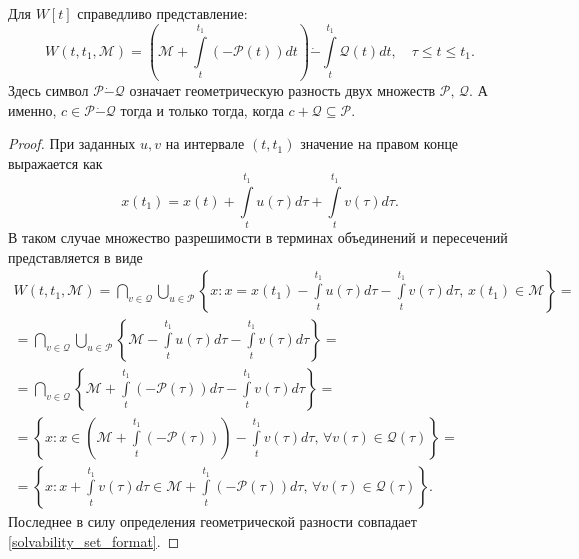 \begin{statement}
    Для \( W[t] \) справедливо представление:
    \begin{equation}\label{solvability_set_format}
        W(t,t_1,\mathcal{M}) = \left( \mathcal{M} + \int\limits_t^{t_1} 
         (-\mathcal{P}(t)) dt \right) \dot{-} \int\limits_t^{t_1} \mathcal{Q}(t) dt,
         \quad \tau \le t \le t_1.
    \end{equation}
    Здесь символ \( \mathcal{P} \dot{-} \mathcal{Q} \) означает геометрическую
     разность двух множеств \( \mathcal{P}, \, \mathcal{Q}\). А именно,
     \( c \in \mathcal{P} \dot{-} \mathcal{Q} \) тогда и только тогда, когда \(c +
     \mathcal{Q} \subseteq \mathcal{P} \).
\end{statement}
\begin{proof}
    При заданных \( u, v \) на интервале \( (t, t_1 ) \) значение на правом конце
     выражается как 
    \begin{equation*}
        x(t_1) = x(t) + \int\limits_t^{t_1}u(\tau)d\tau + \int\limits_t^{t_1}
        v(\tau)d\tau.
    \end{equation*}
    В таком случае множество разрешимости в терминах объединений и пересечений 
     представляется в виде
    \begin{multline*}
        W(t, t_1, \mathcal{M}) = \bigcap\limits_{v \in \mathcal{Q}} 
         \bigcup\limits_{u \in \mathcal{P}} \left\{ x : x = x(t_1)
         -\int\limits_t^{t_1}u(\tau) d\tau - \int\limits_t^{t_1} v(\tau)
         d\tau, \, x(t_1) \in \mathcal{M} \right\} = \\
        = \bigcap\limits_{v \in \mathcal{Q}} \bigcup\limits_{u \in 
         \mathcal{P}} \left\{ \mathcal{M} - \int\limits_t^{t_1} u(\tau) d\tau
         - \int\limits_t^{t_1} v(\tau) d\tau \right\} = \\
        = \bigcap\limits_{v \in \mathcal{Q}} \left\{ \mathcal{M} +
         \int\limits_t^{t_1}(-\mathcal{P}(\tau)) d\tau - \int\limits_t^{t_1}
         v(\tau) d\tau \right\} = \\
        = \left\{ x : x \in \left( \mathcal{M} + \int\limits_t^{t_1}(- \mathcal{P}
         (\tau)) \right)  - \int\limits_t^{t_1} v(\tau) d\tau, \, \forall v(\tau)
         \in \mathcal{Q}(\tau) \right\} = \\
        = \left\{ x : x + \int\limits_t^{t_1} v(\tau) d\tau \in \mathcal{M} + 
         \int\limits_t^{t_1}(- \mathcal{P}(\tau)) d\tau, \, \forall v(\tau) \in
         \mathcal{Q}(\tau) \right\}.
    \end{multline*}
    Последнее в силу определения геометрической разности совпадает 
     \eqref{solvability_set_format}.
\end{proof}

